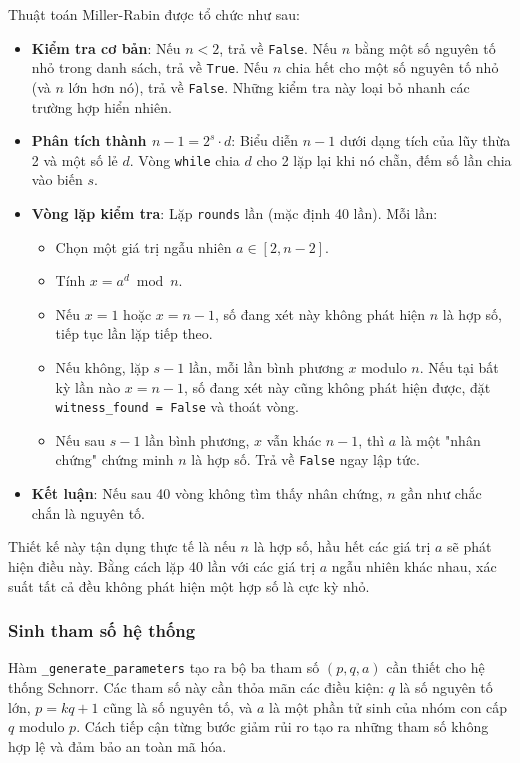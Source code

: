 Thuật toán Miller-Rabin được tổ chức như sau:
\begin{itemize}
	\item \textbf{Kiểm tra cơ bản}: Nếu $n < 2$, trả về \texttt{False}. Nếu $n$ bằng một số nguyên tố nhỏ trong danh sách, trả về \texttt{True}. Nếu $n$ chia hết cho một số nguyên tố nhỏ (và $n$ lớn hơn nó), trả về \texttt{False}. Những kiểm tra này loại bỏ nhanh các trường hợp hiển nhiên.
	\item \textbf{Phân tích thành $n - 1 = 2^s \cdot d$}: Biểu diễn $n - 1$ dưới dạng tích của lũy thừa 2 và một số lẻ $d$. Vòng \texttt{while} chia $d$ cho 2 lặp lại khi nó chẵn, đếm số lần chia vào biến $s$.
	\item \textbf{Vòng lặp kiểm tra}: Lặp \texttt{rounds} lần (mặc định 40 lần). Mỗi lần:
	\begin{itemize}
		\item Chọn một giá trị ngẫu nhiên $a \in [2, n - 2]$.
		\item Tính $x = a^d \bmod n$.
		\item Nếu $x = 1$ hoặc $x = n - 1$, số đang xét này không phát hiện $n$ là hợp số, tiếp tục lần lặp tiếp theo.
		\item Nếu không, lặp $s - 1$ lần, mỗi lần bình phương $x$ modulo $n$. Nếu tại bất kỳ lần nào $x = n - 1$, số đang xét này cũng không phát hiện được, đặt \texttt{witness\_found = False} và thoát vòng.
		\item Nếu sau $s - 1$ lần bình phương, $x$ vẫn khác $n - 1$, thì $a$ là một "nhân chứng" chứng minh $n$ là hợp số. Trả về \texttt{False} ngay lập tức.
	\end{itemize}
	\item \textbf{Kết luận}: Nếu sau 40 vòng không tìm thấy nhân chứng, $n$ gần như chắc chắn là nguyên tố.
\end{itemize}

Thiết kế này tận dụng thực tế là nếu $n$ là hợp số, hầu hết các giá trị $a$ sẽ phát hiện điều này. Bằng cách lặp 40 lần với các giá trị $a$ ngẫu nhiên khác nhau, xác suất tất cả đều không phát hiện một hợp số là cực kỳ nhỏ.

\subsubsection{Sinh tham số hệ thống}
Hàm \texttt{\_generate\_parameters} tạo ra bộ ba tham số $(p, q, a)$ cần thiết cho hệ thống Schnorr. Các tham số này cần thỏa mãn các điều kiện: $q$ là số nguyên tố lớn, $p = kq + 1$ cũng là số nguyên tố, và $a$ là một phần tử sinh của nhóm con cấp $q$ modulo $p$. Cách tiếp cận từng bước giảm rủi ro tạo ra những tham số không hợp lệ và đảm bảo an toàn mã hóa.

